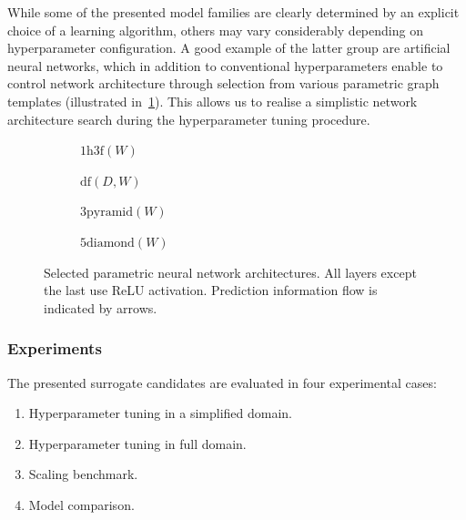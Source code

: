 While some of the presented model families are clearly determined by an explicit
choice of a learning algorithm, others may vary considerably depending on
hyperparameter configuration. A good example of the latter group are artificial neural
networks, which in addition to conventional hyperparameters enable to control network
architecture through selection from various parametric graph templates
(illustrated in~\cref{fig:nn-archs}). This allows us to realise a simplistic
network architecture search during the hyperparameter tuning procedure.

\begin{figure}[h]
	\centering
	\begin{subfigure}[b]{0.25\textwidth}
		\centering
		{\scriptsize {}}
		\caption{$\text{1h3f}(W)$}
	\end{subfigure}\hfill%
	\begin{subfigure}[b]{0.25\textwidth}
		\centering
		{\scriptsize {}}
		\caption{$\text{df}(D,W)$}
	\end{subfigure}\hfill%
	\begin{subfigure}[b]{0.25\textwidth}
		\centering
		{\scriptsize {}}
		\caption{$\text{3pyramid}(W)$}
	\end{subfigure}\hfill%
	\begin{subfigure}[b]{0.25\textwidth}
		\centering
		{\scriptsize {}}
		\caption{$\text{5diamond}(W)$}
	\end{subfigure}

	\caption{Selected parametric neural network architectures. All layers except
		the last use ReLU activation. Prediction information flow is indicated by
		arrows.}
	\label{fig:nn-archs}
\end{figure}

\subsubsection{Experiments}
\label{sec:experiment-methodology}

The presented surrogate candidates are evaluated in four experimental cases:%
\begin{enumerate}
	\item Hyperparameter tuning in a simplified domain.

	\item Hyperparameter tuning in full domain.

	\item Scaling benchmark.

	\item Model comparison.
\end{enumerate}

